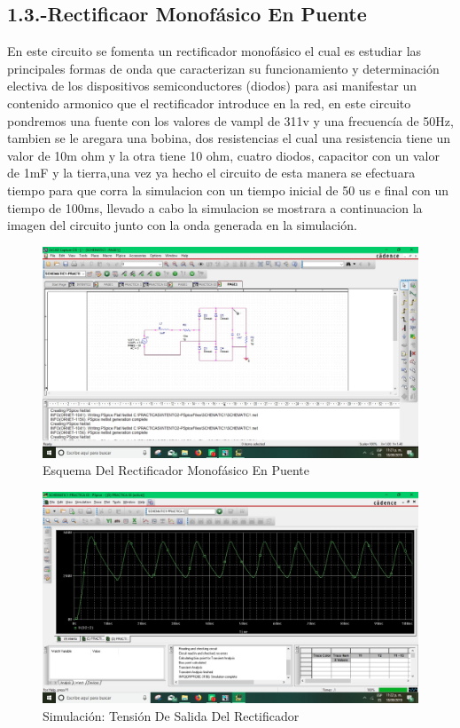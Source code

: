 \documentclass[10pt,a4paper]{article}
\begin{document}
\newpage
\subsection{1.3.-Rectificaor Monofásico En Puente}
En este circuito se fomenta un rectificador monofásico el cual es estudiar las principales formas de onda que caracterizan su funcionamiento y determinación electiva de los dispositivos semiconductores (diodos) para asi manifestar  un contenido armonico que el rectificador introduce en la red, en este circuito pondremos una fuente con los valores de vampl de 311v y una frecuencía de 50Hz, tambien se le aregara una bobina, dos resistencias el cual una resistencia tiene un valor de 10m ohm y la otra tiene 10 ohm, cuatro diodos, capacitor con un valor de 1mF y la tierra,una vez ya hecho el circuito de esta manera se efectuara tiempo para que corra la simulacion con un tiempo inicial de 50 us e final con un tiempo de 100ms, llevado a cabo la simulacion se mostrara a continuacion la imagen del circuito junto con la onda generada en la simulación.
\begin{figure}[hbtp]
\centering
\includegraphics[scale=0.3]{03.jpeg}
\caption{Esquema Del Rectificador Monofásico En Puente}
\end{figure}
\begin{figure}[hbtp]
\centering
\includegraphics[scale=0.3]{3.jpeg}
\caption{Simulación: Tensión De Salida Del Rectificador}
\end{figure}
\end{document}

